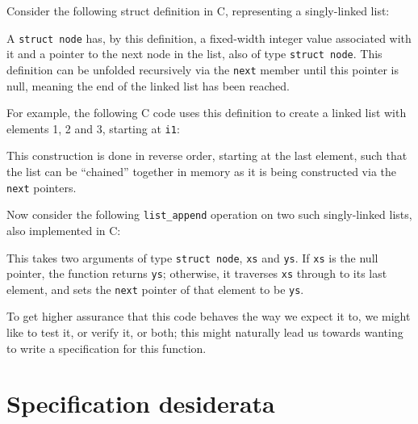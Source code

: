 Consider the following struct definition in C, representing a singly-linked list: 

\begin{center}

\end{center}

A \texttt{struct node} has, by this definition, a fixed-width integer value associated with it and a pointer to the next node in the list, also of type \texttt{struct node}. This definition can be unfolded recursively via the \texttt{next} member until this pointer is null, meaning the end of the linked list has been reached.

For example, the following C code uses this definition to create a linked list with elements 1, 2 and 3, starting at \texttt{i1}:

\begin{center}

\end{center}

This construction is done in reverse order, starting at the last element, such that the list can be ``chained'' together in memory as it is being constructed via the \texttt{next} pointers.

Now consider the following \texttt{list\_append} operation on two such singly-linked lists, also implemented in C:

\begin{figure}
    \begin{center}
    
    \vspace{-1em}
    \end{center}
\end{figure}


This takes two arguments of type \texttt{struct node}, \texttt{xs} and \texttt{ys}. If \texttt{xs} is the null pointer, the function returns \texttt{ys}; otherwise, it traverses \texttt{xs} through to its last element, and sets the \texttt{next} pointer of that element to be \texttt{ys}.

To get higher assurance that this code behaves the way we expect it to, we might like to test it, or verify it, or both; this might naturally lead us towards wanting to write a specification for this function. 

\section{Specification desiderata}\label{sec:spec-desiderata}


